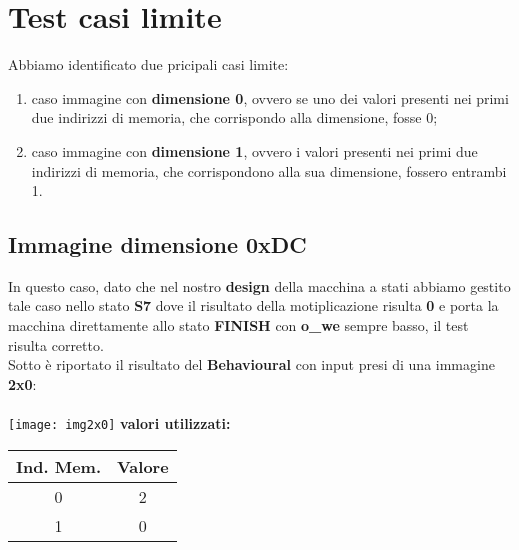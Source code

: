 \documentclass[a4paper, 12pt]{report}
\begin{document}
		\section{Test casi limite}
			Abbiamo identificato due pricipali casi limite:\\\par
			\begin{enumerate}
 				\item caso immagine con \textbf{dimensione 0}, ovvero se uno dei valori presenti nei primi due indirizzi di memoria, che corrispondo alla dimensione, fosse 0;
					  
 				\item caso immagine con \textbf{dimensione 1}, ovvero i valori presenti nei primi due indirizzi di memoria, che corrispondono alla sua dimensione, fossero entrambi 1.
			\end{enumerate}
			\subsection{Immagine dimensione 0xDC}
				In questo caso, dato che nel nostro \textbf{design} della macchina a stati abbiamo gestito tale caso nello stato \textbf{S7} dove il risultato della motiplicazione risulta \textbf{0} e porta la macchina
				direttamente allo stato \textbf{FINISH} con \textbf{o\_we} sempre basso, il test risulta corretto.\\
				Sotto è riportato il risultato del \textbf{Behavioural} con input presi di una immagine \textbf{2x0}:\\\\
				\texttt{[image: img2x0]}
					\textbf{valori utilizzati:}\\
						\begin{center}
						\begin{tabular}{|c | c|}
					 		\hline Ind. Mem. & Valore \\ \hline 
								0 & 2\\ \hline
								1 & 0\\ \hline
						\end{tabular}
						\end{center}	
\end{document}
